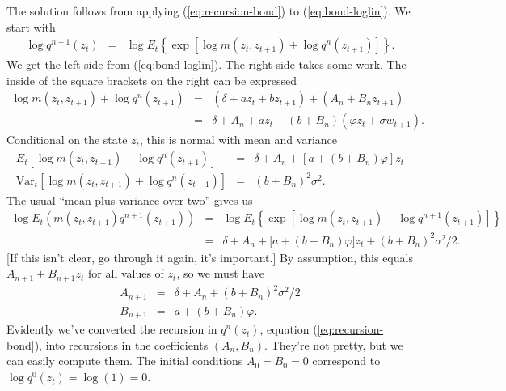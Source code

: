 \documentclass[11pt]{article}
\begin{document}
\begin{enumerate}
The solution follows from applying (\ref{eq:recursion-bond}) to (\ref{eq:bond-loglin}).
We start with
\begin{eqnarray*}
    \log q^{n+1} ( z_t )
        &=& \log E_t \left\{
                \exp \left[ \log m(z_t,z_{t+1}) + \log q^{n}(z_{t+1}) \right]
                \right\} .
\end{eqnarray*}
We get the left side from (\ref{eq:bond-loglin}).
The right side takes some work.
The inside of the square brackets on the right can be expressed
\begin{eqnarray*}
    \log m(z_t,z_{t+1}) + \log q^{n}(z_{t+1})
            &=&  (\delta + a z_t + b z_{t+1} ) +  (A_n + B_n z_{t+1} ) \\
            &=& \delta + A_n + a z_t + (b + B_n) (\varphi z_t + \sigma w_{t+1}) .
\end{eqnarray*}
Conditional on the state $z_t$, this is normal with mean and variance 
\begin{eqnarray*}
    E_t \left[ \log m(z_t,z_{t+1}) + \log q^{n}(z_{t+1}) \right] 
            &=&  \delta + A_n + [a + (b + B_n) \varphi] z_t \\
    \mbox{Var}_t  \left[ \log m(z_t,z_{t+1}) + \log q^{n}(z_{t+1}) \right] 
            &=& (b + B_n)^2 \sigma^2 .
\end{eqnarray*}
The usual ``mean plus variance over two'' gives us
\begin{eqnarray*}
        \log E_t \left(  m(z_t,z_{t+1}) q^{n+1}(z_{t+1}) \right)
        &=& \log E_t  \left\{
                \exp \left[ \log m(z_t,z_{t+1}) + \log q^{n+1}(z_{t+1}) \right]
                \right\} \\
        &=&  \delta + A_n + \big[ a + (b + B_n) \varphi \big] z_t  + (b+B_n)^2 \sigma^2/2 .
\end{eqnarray*}
[If this isn't clear, go through it again, it's important.]
By assumption, this equals $ A_{n+1} + B_{n+1} z_t $ for all values of $z_t$,
so we must have
\begin{eqnarray*}
    A_{n+1} &=& \delta + A_n +  (b+B_n)^2 \sigma^2/2  \\
    B_{n+1} &=& a + (b + B_n) \varphi .
\end{eqnarray*}
Evidently we've converted the recursion in $q^n(z_t)$, equation (\ref{eq:recursion-bond}),
into recursions in the coefficients $(A_n , B_n) $.
They're not pretty, but we can easily compute them.
The initial conditions $A_0 = B_0 = 0 $ correspond to $\log q^0(z_t) = \log (1) = 0$.


\begin{comment}
We studied examples earlier in which $z_t$ was one-dimensional
and the bond price was loglinear:  $ \log q^n(z_t) = A_n + B_n z_t$.
The recursions in the bond price functions in these models translate into recursions
in the coefficients $ (A_n,B_n) $.


\end{comment}
\end{enumerate}
\end{document}
